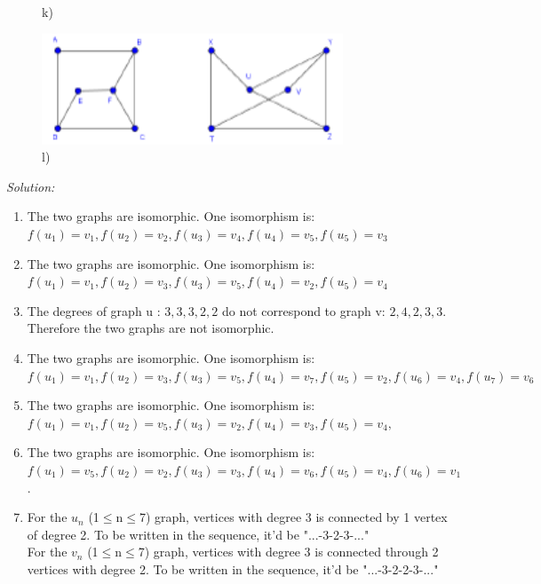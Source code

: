 \documentclass[a4paper]{article}
\begin{document}
\begin{figure}[ht]
\begin{minipage}{0.5\textwidth}
			\caption*{k)}
		\end{minipage}
		\begin{minipage}{0.5\textwidth}
			\centering
			\includegraphics[width=0.8\textwidth]{gprob4_12.png}
			\caption*{l)}
		\end{minipage}
	\end{figure}
	\emph{Solution:}
	\begin{enumerate}[label = \alph*)]
		\item The two graphs are isomorphic. One isomorphism is: \\ $f(u_1) = v_1 , f(u_2) = v_2, f(u_3) = v_4,f(u_4) = v_5, f(u_5) = v_3$
		\item The two graphs are isomorphic. One isomorphism is:\\ $f(u_1) = v_1 , f(u_2) = v_3, f(u_3) = v_5,f(u_4) = v_2, f(u_5) = v_4$
		\item The degrees of graph u : $3,3,3,2,2$ do not correspond to graph v: $2,4,2,3,3$. Therefore the two graphs are not isomorphic.
		\item The two graphs are isomorphic. One isomorphism is:\\ $f(u_1) = v_1 , f(u_2) = v_3, f(u_3) = v_5,f(u_4) = v_7, f(u_5) = v_2, f(u_6) = v_4, f(u_7) = v_6$
		\item The two graphs are isomorphic. One isomorphism is:\\ $f(u_1) = v_1 , f(u_2) = v_5, f(u_3) = v_2,f(u_4) = v_3, f(u_5) = v_4, $
		\item The two graphs are isomorphic. One isomorphism is:\\ $f(u_1) = v_5 , f(u_2) = v_2, f(u_3) = v_3,f(u_4) = v_6, f(u_5) = v_4, f(u_6) = v_1 $.
		\item
		      For the $u_n$ (1$\leq$n$\leq$7) graph, vertices with degree 3 is connected by 1 vertex of degree 2. To be written in the sequence, it'd be "...-3-2-3-..." \\
		      For the $v_n$ (1$\leq$n$\leq$7) graph, vertices with degree 3 is connected through 2 vertices with degree 2. To be written in the sequence, it'd be "...-3-2-2-3-..." \\

\end{enumerate}
\end{document}
